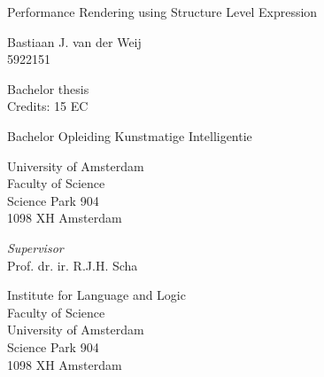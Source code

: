 \documentclass[a4paper,10pt]{article}
\begin{document}

\begin{titlepage}
\begin{center}

\vspace{2.5cm}

\begin{Huge}
Performance Rendering using Structure Level Expression
\end{Huge}

\vspace{1.5cm}

Bastiaan J. van der Weij\\
5922151

\vspace{1.5cm}

Bachelor thesis\\
Credits: 15 EC

\vspace{0.5cm}

Bachelor Opleiding Kunstmatige Intelligentie

\vspace{0.25cm}

University of Amsterdam\\
Faculty of Science\\
Science Park 904\\
1098 XH Amsterdam

\vspace{4cm}

\emph{Supervisor}\\
Prof. dr. ir. R.J.H. Scha

\vspace{0.25cm}

Institute for Language and Logic\\
Faculty of Science\\
University of Amsterdam\\
Science Park 904\\
1098 XH  Amsterdam


\end{center}
\end{titlepage}
\end{document}
